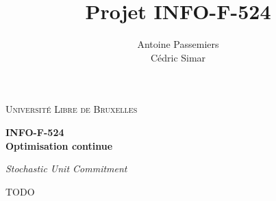 \documentclass[a4paper,11pt]{report}
\title{Projet INFO-F-524}
\author{
	Antoine Passemiers \\
	Cédric Simar
}
\makeatletter
\renewcommand\bibname{Références}
\renewcommand{\refname}{Références}
\renewcommand\@biblabel[1]{#1.  }
\makeatother
\begin{document}
\renewcommand\bibname{References}
\renewcommand{\refname}{References}
\makeatletter
\renewcommand\@biblabel[1]{#1.  }
\makeatother

\begin{titlepage}
	\centering
	{\scshape\LARGE Université Libre de Bruxelles\par}
	\vfill
	{\LARGE\bfseries INFO-F-524 \\ Optimisation continue \par
		\vspace{3ex}}
	{\itshape\Large Stochastic Unit Commitment \par}
	\vfill
	\makeatletter
	{\large \@author\par}
	\vfill
	\@date\par
	\makeatother
\end{titlepage}

\tableofcontents

\setlength\parskip{0.5ex plus1ex minus.5ex}


\newpage









TODO
\citep{Papavasiliou12couplingrenewable}
\citep{Papavasiliou2013}
\citep{mitchell2011pulp}


\newpage



\end{document}
